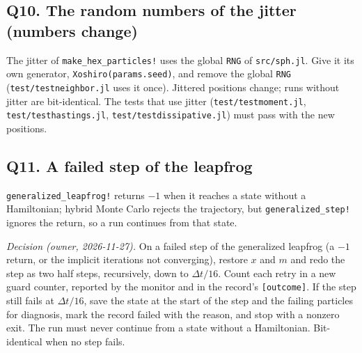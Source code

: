 \documentclass[11pt,aps,preprint,nofootinbib,superscriptaddress,tightenlines]{revtex4-2}
\begin{document}
\subsection*{Q10. The random numbers of the jitter (numbers change)}
The jitter of \texttt{make\_hex\_particles!} uses the global \texttt{RNG} of \nolinkurl{src/sph.jl}.  Give it its own generator,
\texttt{Xoshiro(params.seed)}, and remove the global \texttt{RNG} (\nolinkurl{test/testneighbor.jl} uses it once).  Jittered positions change; runs
without jitter are bit-identical.  The tests that use jitter (\nolinkurl{test/testmoment.jl}, \nolinkurl{test/testhastings.jl},
\nolinkurl{test/testdissipative.jl}) must pass with the new positions.

\subsection*{Q11. A failed step of the leapfrog}
\texttt{generalized\_leapfrog!} returns $-1$ when it reaches a state without a Hamiltonian; hybrid Monte Carlo rejects the trajectory, but
\texttt{generalized\_step!} ignores the return, so a run continues from that state.

\emph{Decision (owner, 2026-11-27).}  On a failed step of the generalized leapfrog (a $-1$ return, or the implicit iterations not
converging), restore $x$ and $m$ and redo the step as two half steps, recursively, down to $\Delta t/16$.  Count each retry in a new
guard counter, reported by the monitor and in the record's \texttt{[outcome]}.  If the step still fails at $\Delta t/16$, save the state at
the start of the step and the failing particles for diagnosis, mark the record failed with the reason, and stop with a nonzero exit.  The
run must never continue from a state without a Hamiltonian.  Bit-identical when no step fails.
\end{document}
